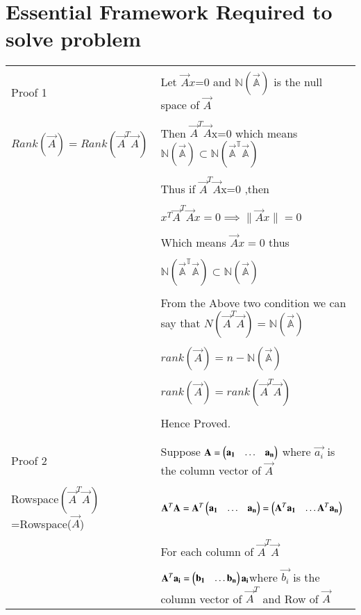 \documentclass[journal,12pt]{IEEEtran}
\begin{document}
\section{\textbf{Essential Framework Required to solve problem }}
\renewcommand{\thetable}{1}
\begin{longtable}{|l|l|}
	\hline
	\multirow{3}{*}{Proof 1}	& \\
	&Let $\vec{A}x$=0 and $\mathbb{N(\vec{A})}$ is the null space of $\vec{A}$\\
	&\\
	$Rank(\vec{A})=Rank(\vec{A}^T\vec{A})$&Then $\vec{A}^T\vec{A}$x=0 which means $\mathbb{N(\vec{A})}\subset \mathbb{N(\vec{A}^T\vec{A})}$ \\
	&\\
	&Thus if $\vec{A}^T\vec{A}$x=0 ,then\\
	&\\
	&$x^T\vec{A}^T\vec{A}x=0\implies\lVert\vec{A}x\rVert=0$\\
	&\\
	&Which means $\vec{A}x=0$ thus\\
	&\\
	& $\mathbb{N(\vec{A}^T\vec{A})}\subset\mathbb{N(\vec{A})}$\\
	&\\
	&From the Above two condition we can say that ${N(\vec{A}^T\vec{A})}=\mathbb{N(\vec{A})}$\\
	&\\
	&$rank(\vec{A})=n-\mathbb{N(\vec{A})}$\\
	&\\
	&$rank(\vec{A})=rank(\vec{A}^T\vec{A})$\\
	&\\
	&Hence Proved.\\
	&\\
	\hline
	\multirow{3}{*}{Proof 2} 
	&\\
	&Suppose $\mathbf{A}=\begin{pmatrix}\mathbf{a_1}&\hdots&\mathbf{a_n}\end{pmatrix}$ where $\vec{a_i}$ is the column vector of $\vec{A}$\\
	&\\
	Rowspace$(\vec{A}^T\vec{A})$=Rowspace($\vec{A}$) & $\mathbf{A}^T\mathbf{A}=\mathbf{A}^T\begin{pmatrix}\mathbf{a_1}&\hdots&\mathbf{a_n}\end{pmatrix}=\begin{pmatrix}\mathbf{A}^T\mathbf{a_1}&\hdots\mathbf{A}^T\mathbf{a_n}\end{pmatrix}$\\
	&\\
	&For each column of $\vec{A}^T\vec{A}$\\
	&\\
	&$\mathbf{A}^T\mathbf{a_i}=\begin{pmatrix}\mathbf{b_1}&\hdots\mathbf{b_n}\end{pmatrix}\mathbf{a_i}$where $\vec{b_i}$ is the column vector of $\vec{A}^T$ and Row of $\vec{A}$\\

\end{longtable}
\end{document}
